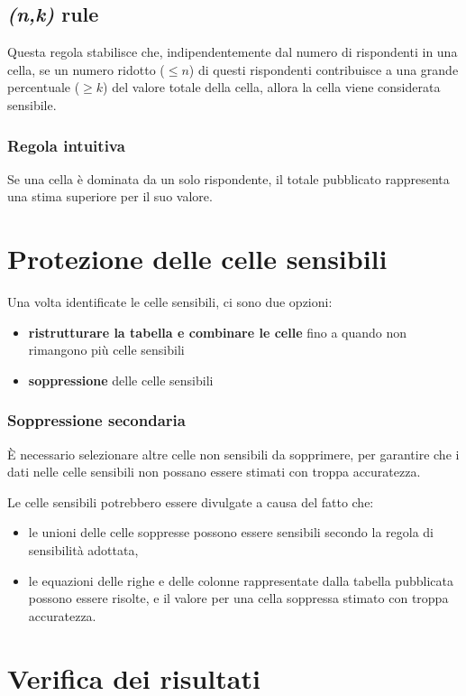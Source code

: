 \documentclass{report}
\begin{document}
\subsection{\textit{(n,k)} rule}
Questa regola stabilisce che, indipendentemente dal numero di rispondenti in una cella, 
se un numero ridotto ($\leq n$) di questi rispondenti contribuisce a una grande percentuale 
($\geq k$) del valore totale della cella, allora la cella viene considerata 
sensibile.

\subsubsection{Regola intuitiva}
Se una cella è dominata da un solo rispondente, il totale pubblicato rappresenta 
una stima superiore per il suo valore.


\section{Protezione delle celle sensibili}
Una volta identificate le celle sensibili, ci sono due opzioni:
\begin{itemize}
    \item \textbf{ristrutturare la tabella e combinare le celle} fino a quando non 
    rimangono più celle sensibili
    \item \textbf{soppressione} delle celle sensibili
\end{itemize}

\subsubsection{Soppressione secondaria}
È necessario selezionare altre celle non sensibili da sopprimere, per garantire che i 
dati nelle celle sensibili non possano essere stimati con troppa accuratezza.

\noindent Le celle sensibili potrebbero essere divulgate a causa del fatto che:
\begin{itemize}
    \item le unioni delle celle soppresse possono essere sensibili secondo la regola di sensibilità adottata,
    \item le equazioni delle righe e delle colonne rappresentate dalla tabella pubblicata possono essere risolte, e il valore per una cella soppressa stimato con troppa accuratezza.
\end{itemize}

\newpage
\section{Verifica dei risultati}
\end{document}
